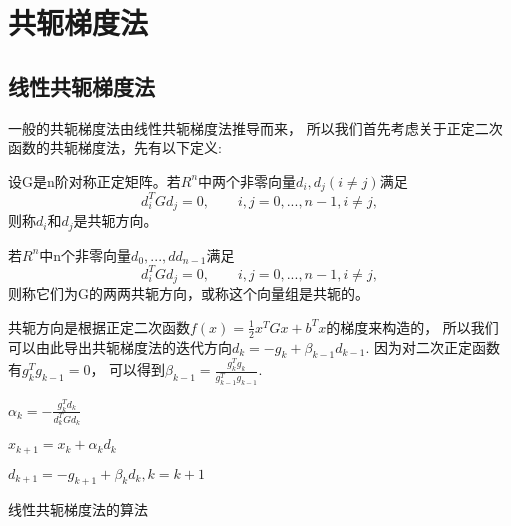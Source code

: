                         
\section{共轭梯度法}
    \subsection{线性共轭梯度法}
        一般的共轭梯度法由线性共轭梯度法推导而来，
        所以我们首先考虑关于正定二次函数的共轭梯度法，先有以下定义:
        
        设G是n阶对称正定矩阵。若$R^n$中两个非零向量$d_i,d_j(i\not=j)$满足
        \begin{equation}
            d_i^TGd_j=0,\quad\quad i,j=0,...,n-1,i\not=j,
        \end{equation}则称$d_i$和$d_j$是共轭方向。
    
        若$R^n$中n个非零向量$d_0,...,dd_{n-1}$满足
        \begin{equation}
            d_i^TGd_j=0,\quad\quad i,j=0,...,n-1,i\not=j,
        \end{equation}则称它们为G的两两共轭方向，或称这个向量组是共轭的。

        共轭方向是根据正定二次函数$f(x)=\frac{1}{2}x^TGx+b^Tx$的梯度来构造的，
        所以我们可以由此导出共轭梯度法的迭代方向$d_k=-g_k+\beta_{k-1}d_{k-1}$.
        因为对二次正定函数有$g_k^Tg_{k-1}=0$，
        可以得到$\beta_{k-1}=\displaystyle\frac{g_k^Tg_k}{g_{k-1}^Tg_{k-1}}$.
    
        
        
        
               
        \begin{algorithm}
        
            \SetAlgoLined
        
             {
                $\alpha_k=-\displaystyle\frac{g_k^Td_k}{d_k^TGd_k}$
                
                $x_{k+1}=x_k+\alpha_kd_k$
                
                $d_{k+1}=-g_{k+1}+\beta_kd_k,k=k+1$
            }
            \caption{线性共轭梯度法的算法}
        \end{algorithm}
               
